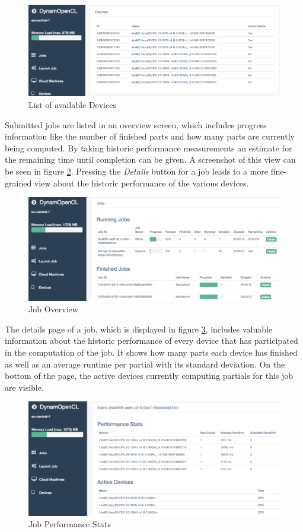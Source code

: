 \begin{figure}[!htb]
	\includegraphics[width=1\textwidth]{screenshots/available_devices.png}
	\centering
	\caption{List of available Devices}
	\label{img:available_devices}
\end{figure}

Submitted jobs are listed in an overview screen, which includes progress information like the number of finished parts and how many parts are currently being computed. By taking historic performance measurements an estimate for the remaining time until completion can be given. A screenshot of this view can be seen in figure \ref{img:job_overview}. Pressing the \textit{Details} button for a job leads to a more fine-grained view about the historic performance of the various devices.

\begin{figure}[!htb]
	\includegraphics[width=1\textwidth]{screenshots/job_overview.png}
	\centering
	\caption{Job Overview}
	\label{img:job_overview}
\end{figure}

The details page of a job, which is displayed in figure \ref{img:job_details}, includes valuable information about the historic performance of every device that has participated in the computation of the job. It shows how many parts each device has finished as well as an average runtime per partial with its standard deviation. On the bottom of the page, the active devices currently computing partials for this job are visible.

\begin{figure}[!htb]
	\includegraphics[width=1\textwidth]{screenshots/job_details.png}
	\centering
	\caption{Job Performance Stats}
	\label{img:job_details}
\end{figure}
